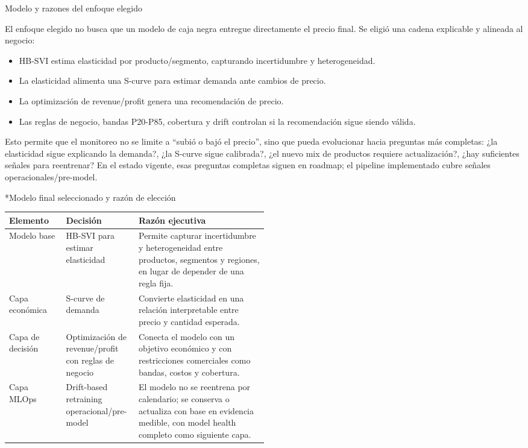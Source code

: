 \documentclass[11pt,letterpaper]{article}
\makeatletter
\renewcommand\section{\@startsection{section}{1}{\z@}
  {-3.5ex \@plus -1ex \@minus -.2ex}
  {2.3ex \@plus .2ex}
  {\Large\bfseries\sffamily\color{azulTec}}}
\renewcommand\subsection{\@startsection{subsection}{2}{\z@}
  {-3.25ex \@plus -1ex \@minus -.2ex}
  {1.5ex \@plus .2ex}
  {\large\bfseries\sffamily\color{azulTec}}}
\makeatother
\begin{document}
\section{Modelo y razones del enfoque elegido}

El enfoque elegido no busca que un modelo de caja negra entregue directamente el precio final. Se eligió una cadena explicable y alineada al negocio:

\begin{itemize}
  \item HB-SVI estima elasticidad por producto/segmento, capturando incertidumbre y heterogeneidad.
  \item La elasticidad alimenta una S-curve para estimar demanda ante cambios de precio.
  \item La optimización de revenue/profit genera una recomendación de precio.
  \item Las reglas de negocio, bandas P20-P85, cobertura y drift controlan si la recomendación sigue siendo válida.
\end{itemize}

Esto permite que el monitoreo no se limite a ``subió o bajó el precio'', sino que pueda evolucionar hacia preguntas más completas: ¿la elasticidad sigue explicando la demanda?, ¿la S-curve sigue calibrada?, ¿el nuevo mix de productos requiere actualización?, ¿hay suficientes señales para reentrenar? En el estado vigente, esas preguntas completas siguen en roadmap; el pipeline implementado cubre señales operacionales/pre-model.

\subsection*{Modelo final seleccionado y razón de elección}

\begin{tabularx}{\linewidth}{L{0.22\linewidth}L{0.28\linewidth}Y}
\toprule
\textbf{Elemento} & \textbf{Decisión} & \textbf{Razón ejecutiva} \\
\midrule
Modelo base & HB-SVI para estimar elasticidad & Permite capturar incertidumbre y heterogeneidad entre productos, segmentos y regiones, en lugar de depender de una regla fija. \\
Capa económica & S-curve de demanda & Convierte elasticidad en una relación interpretable entre precio y cantidad esperada. \\
Capa de decisión & Optimización de revenue/profit con reglas de negocio & Conecta el modelo con un objetivo económico y con restricciones comerciales como bandas, costos y cobertura. \\
Capa MLOps & Drift-based retraining operacional/pre-model & El modelo no se reentrena por calendario; se conserva o actualiza con base en evidencia medible, con model health completo como siguiente capa. \\
\bottomrule
\end{tabularx}
\end{document}
